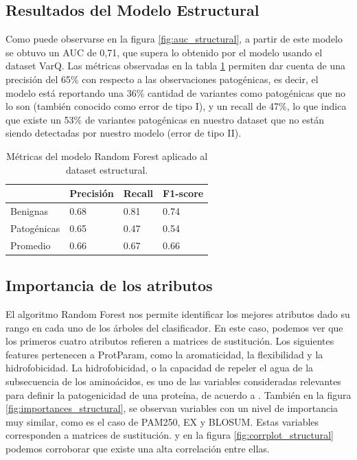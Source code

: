 \subsection{Resultados del Modelo Estructural}

Como puede observarse en la figura \ref{fig:auc_structural}, a partir de este modelo se obtuvo un AUC de 0,71, que supera lo obtenido por el modelo usando el dataset VarQ. Las métricas observadas en la tabla \ref{structural_table} permiten dar cuenta de una precisión del 65\% con respecto a las observaciones patogénicas, es decir, el modelo está reportando una 36\% cantidad de variantes como patogénicas que no lo son (también conocido como error de tipo I), y un recall de 47\%, lo que indica que existe un 53\% de variantes patogénicas en nuestro dataset que no están siendo detectadas por nuestro modelo (error de tipo II). 

\begin{table}[H]
\centering
\begin{tabular}{|l|l|l|l|}
\hline
              & Precisión & Recall & F1-score \\ \hline
Benignas      & 0.68      & 0.81   & 0.74     \\ \hline
Patogénicas   & 0.65      & 0.47   & 0.54     \\ \hline
Promedio      & 0.66      & 0.67   & 0.66     \\ \hline
\end{tabular}
\caption{Métricas del modelo Random Forest aplicado al dataset estructural.}
\label{structural_table}
\end{table}


\subsection{Importancia de los atributos}

El algoritmo Random Forest nos permite identificar los mejores atributos dado su rango en cada uno de los árboles del clasificador. En este caso, podemos ver que los primeros cuatro atributos refieren a matrices de sustitución. Los siguientes features pertenecen a ProtParam, como la aromaticidad, la flexibilidad y la hidrofobicidad. La hidrofobicidad, o la capacidad de repeler el agua de la subsecuencia de los aminoácidos, es uno de las variables consideradas relevantes para definir la patogenicidad de una proteína, de acuerdo a \cite{Wang2016}. También en la figura \ref{fig:importances_structural}, se observan variables con un nivel de importancia muy similar, como es el caso de PAM250, EX y BLOSUM. Estas variables corresponden a matrices de sustitución. y en la figura \ref{fig:corrplot_structural} podemos corroborar que existe una alta correlación entre ellas.  

